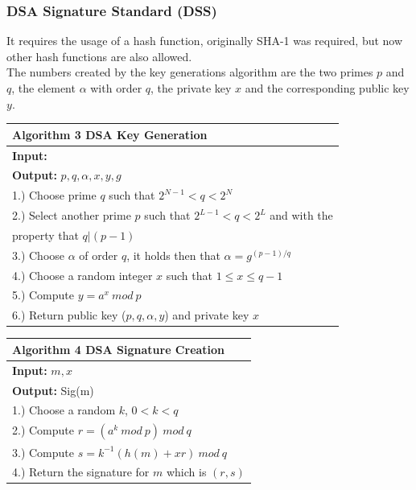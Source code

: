 \documentclass[a4paper, 10 pt, conference]{ieeeconf}
\begin{document}
\subsubsection{\textbf{DSA Signature Standard (DSS)}}
It requires the usage of a hash function, originally SHA-1 was required, but now other hash functions are also allowed. \\
The numbers created by the key generations algorithm are the two primes $p$ and $q$, the element $\alpha$ with order $q$, the private key $x$ and the corresponding public key $y$.
\begin{table}[h!]
  \begin{center}
    \begin{tabularx}{\columnwidth}{ l   }
    \toprule
    \textbf{Algorithm 3} DSA Key Generation \\ \midrule
    \textbf{Input:}  \\ 
    \textbf{Output:} $p,q,\alpha,x,y,g$ \\
    1.) Choose prime $q$ such that $2^{N-1} < q < 2^{N}$ \\
    2.) Select another prime $p$ such that $2^{L-1} < q < 2^{L}$ and with the \\
    property that $q|(p-1)$ \\
    3.) Choose $\alpha$ of order $q$, it holds then that $\alpha = g^{(p-1)/q}$ \\
    4.) Choose a random integer $x$ such that $1 \leq x \leq q-1$ \\
    5.) Compute $y = a^{x} \ mod \ p$ \\
    6.) Return public key ($p,q,\alpha,y$) and private key $x$\\
    \bottomrule
    \end{tabularx}
  \end{center}
\end{table}

\begin{table}[h!]
  \begin{center}
    \begin{tabularx}{\columnwidth}{ l   }
    \toprule
    \textbf{Algorithm 4} DSA Signature Creation \\ \midrule
    \textbf{Input:} $m,x$ \\ 
    \textbf{Output:} Sig(m) \\
    1.) Choose a random $k$, $0 < k < q$ \\
    2.) Compute $r = (a^k \ mod \ p) \ mod \ q$ \\
    3.) Compute $s = k^{-1}(h(m) + xr) \ mod \ q$ \\
    4.) Return the signature for $m$ which is $(r,s)$\\
    \bottomrule
    \end{tabularx}
  \end{center}
\end{table}
\end{document}
